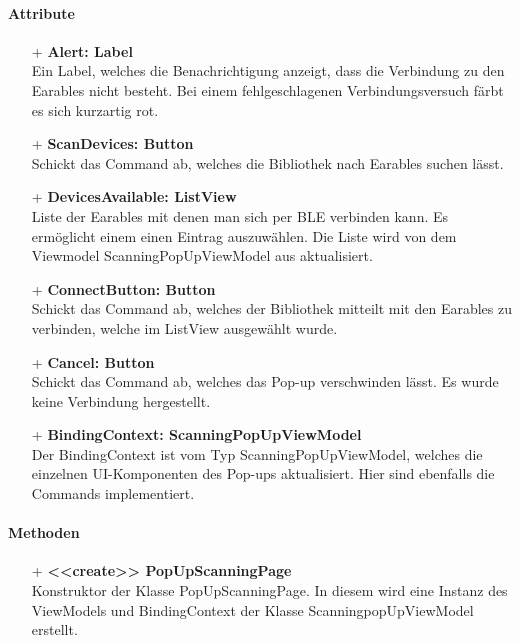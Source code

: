 \documentclass[a4paper,12pt]{article}
\begin{document}
		\paragraph{Attribute}
		\begin{itemize}
		\item[+] \textbf{Alert: Label}\\Ein Label, welches die Benachrichtigung anzeigt, dass die Verbindung zu den \gls{Earables} nicht besteht. Bei einem fehlgeschlagenen Verbindungsversuch färbt es sich kurzartig rot.
		\item[+] \textbf{ScanDevices: Button}\\Schickt das Command ab, welches die Bibliothek nach \gls{Earables} suchen lässt.
		\item[+] \textbf{DevicesAvailable: ListView}\\Liste der \Gls{Earables} mit denen man sich per \gls{BLE} verbinden kann. Es ermöglicht einem einen Eintrag auszuwählen. Die Liste wird von dem Viewmodel ScanningPopUpViewModel aus aktualisiert.
		\item[+] \textbf{ConnectButton: Button}\\Schickt das Command ab, welches der Bibliothek mitteilt mit den \Gls{Earables} zu verbinden, welche im ListView ausgewählt wurde.
		\item[+] \textbf{Cancel: Button}\\Schickt das Command ab, welches das Pop-up verschwinden lässt. Es wurde keine Verbindung hergestellt.
		\item[+] \textbf{BindingContext: ScanningPopUpViewModel}\\Der BindingContext ist vom Typ ScanningPopUpViewModel, welches die einzelnen UI-Komponenten des Pop-ups aktualisiert. Hier sind ebenfalls die Commands implementiert.
		\end{itemize}
		
		\paragraph{Methoden}
		\begin{itemize}
		\item[+] \textbf{<<create>> PopUpScanningPage}\\Konstruktor der Klasse PopUpScanningPage. In diesem wird eine Instanz des ViewModels und BindingContext der Klasse ScanningpopUpViewModel erstellt.
		\end{itemize}
\end{document}
